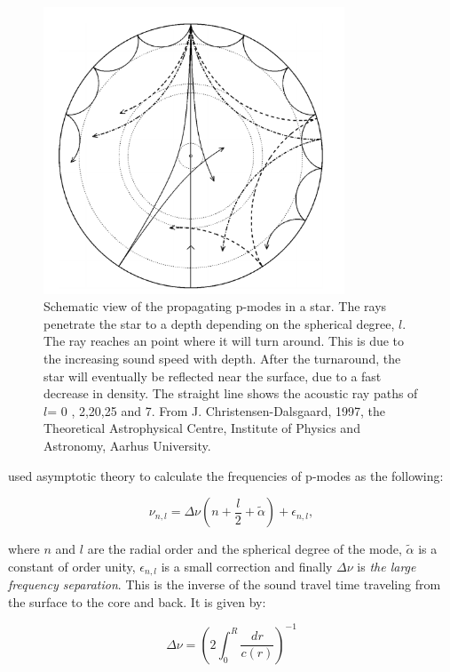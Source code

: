 \begin{figure}[t]
    \centering
    \includegraphics[width=0.8\textwidth]{propagationrays.png}
    \caption{Schematic view of the propagating p-modes in a star. The rays penetrate the star to a depth depending  on the spherical degree, $l$. The ray reaches an point where it will turn around. This is due to the increasing sound speed with depth. After the turnaround, the star will eventually be reflected near the surface, due to a fast decrease in density. The straight line shows the acoustic ray paths of $l$= 0 , 2,20,25 and 7. From J. Christensen-Dalsgaard, 1997, the Theoretical Astrophysical Centre, Institute of Physics and Astronomy, Aarhus University.}
    \label{rays}
\end{figure}

\citep{tassoul1980, tassoul1990} used asymptotic theory to calculate the frequencies of p-modes as the following: 

\begin{equation}
    \nu_{n,l} = \Delta\nu\left(n+\frac{l}{2}+\widetilde{\alpha}\right) + \epsilon_{n,l},
\end{equation}

\noindent where $n$ and $l$ are the radial order and the spherical degree of the mode, $\widetilde{\alpha}$ is a constant of order unity, $\epsilon_{n,l}$ is a small correction and finally $\Delta\nu$ is \textit{the large frequency separation}. This is the inverse of the sound travel time traveling from the surface to the core and back. It is given by: 

\begin{equation}
\label{deltanu}
    \Delta\nu = \left( 2\int_{0}^{R}\frac{dr}{c(r)}\right)^{-1}
\end{equation}


